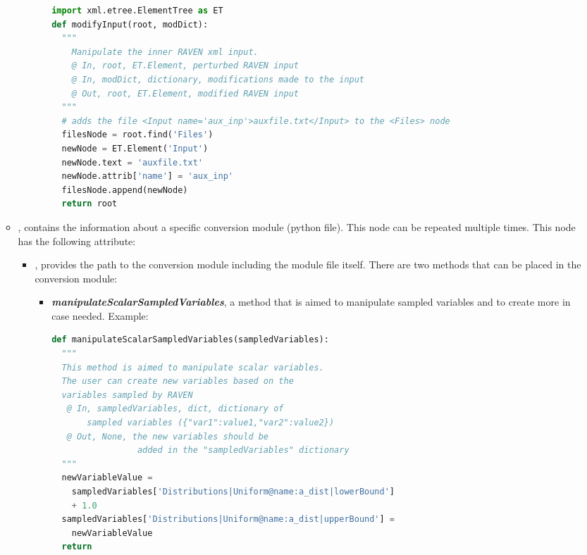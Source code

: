 \begin{itemize}
\begin{itemize}
\begin{itemize}
\begin{itemize}
\begin{lstlisting}[language=python]
import xml.etree.ElementTree as ET
def modifyInput(root, modDict):
  """
    Manipulate the inner RAVEN xml input.
    @ In, root, ET.Element, perturbed RAVEN input
    @ In, modDict, dictionary, modifications made to the input
    @ Out, root, ET.Element, modified RAVEN input
  """
  # adds the file <Input name='aux_inp'>auxfile.txt</Input> to the <Files> node
  filesNode = root.find('Files')
  newNode = ET.Element('Input')
  newNode.text = 'auxfile.txt'
  newNode.attrib['name'] = 'aux_inp'
  filesNode.append(newNode)
  return root
                   \end{lstlisting}
              \end{itemize} %
        \end{itemize} %

      \item {},  contains the information about a specific
        conversion module (python file).  This node can be repeated multiple times.
        This node has the following attribute:
        \begin{itemize} %
          \item {},  provides the path to the conversion module including
              the module file itself.  There are two methods that can be placed in the conversion module:
              \begin{itemize} %
                 \item \textbf{\textit{manipulateScalarSampledVariables}}, a method that is aimed to manipulate sampled variables and to create more in case needed.
                 Example:
                  \begin{lstlisting}[language=python]
def manipulateScalarSampledVariables(sampledVariables):
  """
  This method is aimed to manipulate scalar variables.
  The user can create new variables based on the
  variables sampled by RAVEN
   @ In, sampledVariables, dict, dictionary of
       sampled variables ({"var1":value1,"var2":value2})
   @ Out, None, the new variables should be
                 added in the "sampledVariables" dictionary
  """
  newVariableValue =
    sampledVariables['Distributions|Uniform@name:a_dist|lowerBound']
    + 1.0
  sampledVariables['Distributions|Uniform@name:a_dist|upperBound'] =
    newVariableValue
  return
                   \end{lstlisting}


\end{itemize}
\end{itemize}
\end{itemize}
\end{itemize}
